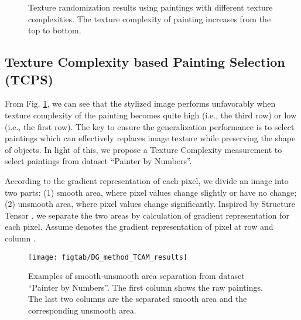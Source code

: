 \documentclass[twocolumn,journal,vlined,ruled,linesnumbered]{IEEEtran}
\begin{document}
\begin{figure}[t]
\begin{centering}
\centering{}\centering {}
\par\end{centering}
\vspace{-4mm}
\caption{Texture randomization results using paintings with different texture complexities. The texture complexity of painting increases from the top to bottom. \label{fig:The-motivation-for-TAM}}
\vspace{-4mm}
\end{figure}


\subsection{Texture Complexity based Painting Selection (TCPS)}

From Fig. \ref{fig:The-motivation-for-TAM}, we can see that the stylized image performs unfavorably when texture complexity of the painting becomes quite high (i.e., the third row) or low (i.e., the first row). The key to ensure the generalization performance is to select paintings which can effectively replaces image texture while preserving the shape of objects. In light of this, we propose a Texture Complexity measurement to select paintings from dataset ``Painter by Numbers\textquotedblright .

According to the gradient representation of each pixel, we divide an image into two parts: (1) smooth area, where pixel values change slightly or have no change; (2) unsmooth area, where pixel values change significantly. Inspired by Structure Tensor \cite{kothe2003edge}, we separate the two areas by calculation of gradient representation for each pixel. Assume  denotes the gradient representation of pixel at row  and column .

\begin{figure}[t]
\begin{centering}
\texttt{[image: figtab/DG\_method\_TCAM\_results]}
\par\end{centering}
\vspace{-4mm}
\caption{Examples of smooth-unsmooth area separation from dataset ``Painter by Numbers\textquotedblright . The first column shows the raw paintings. The last two columns are the separated smooth area and the corresponding unsmooth area.\label{fig:The-results-of-TCAM}}
\vspace{-5mm}
\end{figure}
\end{document}
